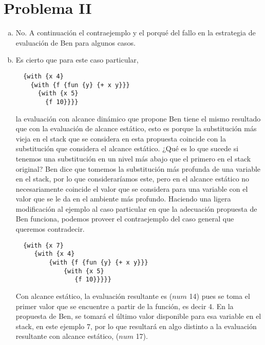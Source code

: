 \documentclass[12pt]{article}
\begin{document}
\section{Problema II}
\begin{enumerate}[a)]
\item No. A continuación el contraejemplo y el porqué del fallo en la estrategia de evaluación de Ben para algunos casos.
\item Es cierto que para este caso particular,
\begin{verbatim}
  {with {x 4}
    {with {f {fun {y} {+ x y}}}
      {with {x 5}
        {f 10}}}}
\end{verbatim}
  la evaluación con alcance dinámico que propone Ben tiene el mismo resultado que con la evaluación
  de alcance estático, esto es porque la substitución más vieja en el stack que se considera en esta propuesta coincide con la substitución que
  considera el alcance estático. ¿Qué es lo que sucede si tenemos una substitución en un nivel más abajo que el primero en el stack original?
  Ben dice que tomemos la substitución más profunda de una variable en el stack, por lo que consideraríamos este, pero en el alcance estático
  no necesariamente coincide el valor que se considera para una variable con el valor que se le da en el ambiente más profundo.
  Haciendo una ligera modificación al ejemplo al caso particular en que la adecuación propuesta de Ben funciona, podemos proveer el contraejemplo
  del caso general que queremos contradecir.
\begin{verbatim}
  {with {x 7}
     {with {x 4}
         {with {f {fun {y} {+ x y}}} 
             {with {x 5} 
                {f 10}}}}}
\end{verbatim}
Con alcance estático, la evaluación resultante es ($num$ 14) pues se toma el primer valor que se encuentre a partir de la función, es decir 4.
En la propuesta de Ben, se tomará el último valor disponible para esa variable en el stack, en este ejemplo 7, por lo que resultará en
algo distinto a la evaluación resultante con alcance estático, ($num$ 17).
\end{enumerate}
\end{document}

